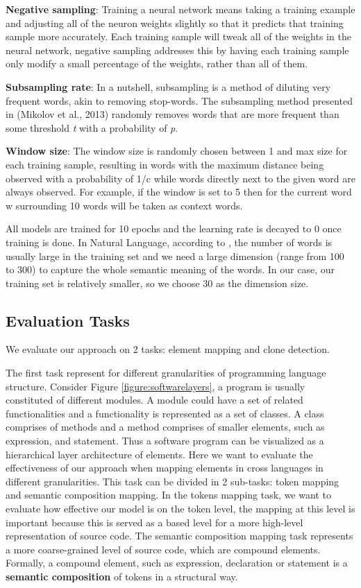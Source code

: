 \textbf{Negative sampling}: Training a neural network means taking a training example and adjusting all of the neuron weights slightly so that it predicts that training sample more accurately. Each training sample will tweak all of the weights in the neural network, negative sampling addresses this by having each training sample only modify a small percentage of the weights, rather than all of them.

\textbf{Subsampling rate}: In a nutshell, subsampling is a method of diluting very frequent words, akin to removing stop-words. The subsampling method presented in (Mikolov et al., 2013) \cite{mikolov2013distributed} randomly removes words that are more frequent than some threshold \textit{t} with a probability of \textit{p}.

\textbf{Window size}: The window size is randomly chosen between 1 and max size for each training sample, resulting in words with the maximum distance being observed with a probability of 1/c while words directly next to the given word are always observed. For example, if the window is set to 5 then for the current word w surrounding 10 words will be taken as context words.

All models are trained for 10 epochs and the learning rate is decayed to 0 once training is done. In Natural Language, according to \cite{pennington2014glove}, the number of words is usually large in the training set and we need a large dimension (range from 100 to 300) to capture the whole semantic meaning of the words. In our case, our training set is relatively smaller, so we choose 30 as the dimension size.
\subsection{Evaluation Tasks}
We evaluate our approach on 2 tasks: element mapping and clone detection. 

The first task represent for different granularities of programming language structure. Consider Figure \ref{figure:softwarelayers}, a program is usually constituted of different modules. A module could have a set of related functionalities and a functionality is represented as a set of classes. A class comprises of methods and a method comprises of smaller elements, such as expression, and statement. Thus a software program can be visualized as a hierarchical layer architecture of elements. Here we want to evaluate the effectiveness of our approach when mapping elements in cross languages in different granularities. This task can be divided in 2 sub-tasks: token mapping and semantic composition mapping. In the tokens mapping task, we want to evaluate how effective our model is on the token level, the mapping at this level is important because this is served as a based level for a more high-level representation of source code. The semantic composition mapping task represents a more coarse-grained level of source code, which are compound elements. Formally, a compound element, such as expression, declaration or statement is a \textbf{semantic composition} of tokens in a structural way. 

